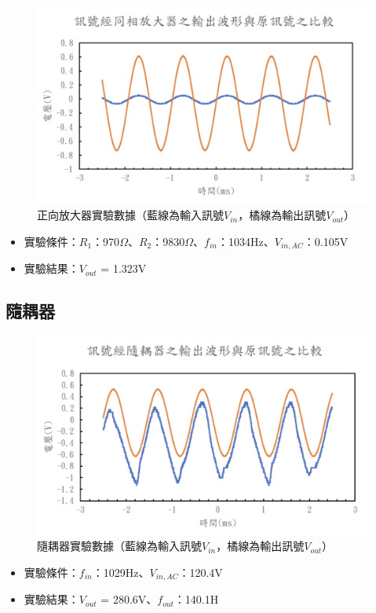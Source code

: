 \documentclass[12pt,a4paper]{article}
\begin{document}
\begin{CJK}{UTF8}{bkai}
\begin{figure}[h]
    \centering
    \includegraphics[width=0.7\linewidth]{figures/exp_2_result.png}
    \caption{正向放大器實驗數據（藍線為輸入訊號$V_{in}$，橘線為輸出訊號$V_{out}$）}
    \label{fig:exp_2_result}
\end{figure}

\begin{itemize}
    \item 實驗條件：$R_1$：970$\Omega$、$R_2$：9830$\Omega$、$f_{in}$：1034Hz、$V_{in, AC}$：0.105V
    \item 實驗結果：$V_{out}$ = 1.323V
\end{itemize}

\subsection{隨耦器}\label{subsec:result_3}
\hfill

\begin{figure}[h]
    \centering
    \includegraphics[width=0.7\linewidth]{figures/exp_3_result.png}
    \caption{隨耦器實驗數據（藍線為輸入訊號$V_{in}$，橘線為輸出訊號$V_{out}$）}
    \label{fig:exp_3_result}
\end{figure}

\begin{itemize}
    \item 實驗條件：$f_{in}$：1029Hz、$V_{in, AC}$：120.4V
    \item 實驗結果：$V_{out}$ = 280.6V、$f_{out}$：140.1H
\end{itemize}



\end{CJK}
\end{document}
